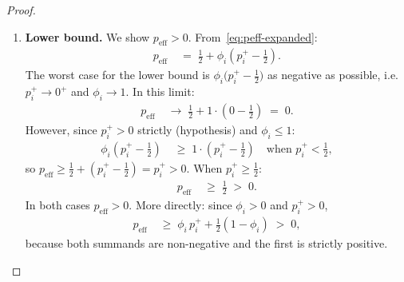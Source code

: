 \documentclass[12pt,openany]{book}
\numberwithin{equation}{chapter}
\theoremstyle{plain}
\theoremstyle{definition}
\theoremstyle{remark}
\numberwithin{equation}{chapter}
\theoremstyle{plain}
\begin{document}
\begin{proof}
\begin{enumerate}
  \item[\textup{(3)}] \textbf{Lower bound.}
        We show $p_{\mathrm{eff}} > 0$.
        From~\eqref{eq:peff-expanded}:
        \begin{align}
          p_{\mathrm{eff}}
          &\;=\; \tfrac{1}{2}
                 + \phi_i\!\left(p_i^+ - \tfrac{1}{2}\right).
          \label{eq:peff-lb-form}
        \end{align}
        The worst case for the lower bound is
        $\phi_i\bigl(p_i^+ - \tfrac{1}{2}\bigr)$
        as negative as possible, i.e.\ $p_i^+ \to 0^+$ and
        $\phi_i \to 1$.  In this limit:
        \begin{align}
          p_{\mathrm{eff}}
          &\;\to\; \tfrac{1}{2} + 1 \cdot (0 - \tfrac{1}{2})
          \;=\; 0.
          \label{eq:peff-lb-limit}
        \end{align}
        However, since $p_i^+ > 0$ strictly (hypothesis) and
        $\phi_i \leq 1$:
        \begin{align}
          \phi_i\!\left(p_i^+ - \tfrac{1}{2}\right)
          &\;\geq\; 1 \cdot \left(p_i^+ - \tfrac{1}{2}\right)
          \quad\text{when } p_i^+ < \tfrac{1}{2},
          \label{eq:peff-lb-case1}
        \end{align}
        so $p_{\mathrm{eff}} \geq \tfrac{1}{2} +
        (p_i^+ - \tfrac{1}{2}) = p_i^+ > 0$.
        When $p_i^+ \geq \tfrac{1}{2}$:
        \begin{align}
          p_{\mathrm{eff}}
          &\;\geq\; \tfrac{1}{2} \;>\; 0.
          \label{eq:peff-lb-case2}
        \end{align}
        In both cases $p_{\mathrm{eff}} > 0$.
        More directly: since $\phi_i > 0$ and $p_i^+ > 0$,
        \begin{align}
          p_{\mathrm{eff}}
          &\;\geq\; \phi_i\,p_i^+
                    + \tfrac{1}{2}(1-\phi_i)
          \;>\; 0,
          \label{eq:peff-lb-direct}
        \end{align}
        because both summands are non-negative and the first
        is strictly positive.


\end{enumerate}
\end{proof}
\end{document}
